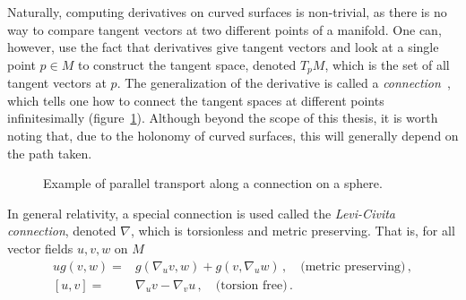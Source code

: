 Naturally, computing derivatives on curved surfaces is non-trivial, as there is no way to compare tangent vectors at two different points of a manifold. One can, however, use the fact that derivatives give tangent vectors and look at a single point $p\in M$ to construct the tangent space, denoted $T_pM$, which is the set of all tangent vectors at $p$. The generalization of the derivative is called a \textit{connection}~\cite{baez_john_gauge_1994}, which tells one how to connect the tangent spaces at different points infinitesimally (figure~\ref{fig:parallel_transport}). Although beyond the scope of this thesis, it is worth noting that, due to the holonomy of curved surfaces, this will generally depend on the path taken.
\begin{figure}
    \centering
    \caption{Example of parallel transport along a connection on a sphere. }
    \label{fig:parallel_transport}
\end{figure}
In general relativity, a special connection is used called the \textit{Levi-Civita connection}, denoted $\nabla$, which is torsionless and metric preserving. That is, for all vector fields $u,v,w$ on $M$
\begin{equation}
    \begin{split}
        u g(v,w) =& g(\nabla_u v, w)+g(v,\nabla_uw) \,,\quad \text{(metric preserving)} \,,\\
        [u,v] =& \nabla_u v - \nabla_v u \,,\quad \text{(torsion free)}\,.
    \end{split}
\end{equation}

